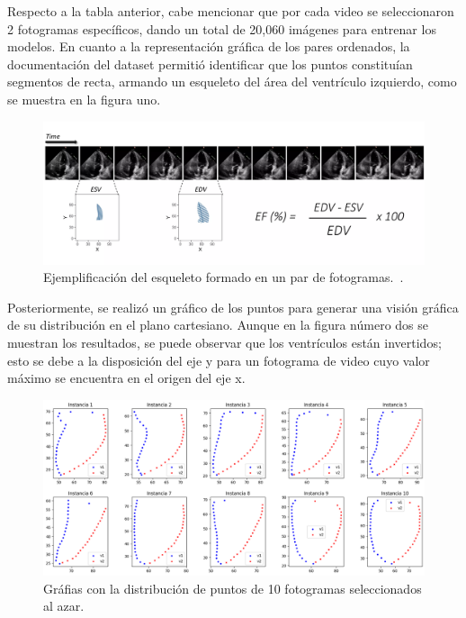 \documentclass[runningheads]{llncs}
\begin{document}
Respecto a la tabla anterior, cabe mencionar que por cada video se seleccionaron 2 fotogramas específicos, dando un total de 20,060 imágenes para entrenar los modelos. En cuanto a la representación gráfica de los pares ordenados, la documentación del dataset permitió identificar que los puntos constituían segmentos de recta, armando un esqueleto del área del ventrículo izquierdo, como se muestra en la figura uno.

\begin{figure}
    \centering
    \includegraphics[scale=0.085]{images/esqueleto2.png}
    \caption{Ejemplificación del esqueleto formado en un par de fotogramas.~\cite{ref_url1}.}\label{fig:imagen1}
\end{figure}

Posteriormente, se realizó un gráfico de los puntos para generar una visión gráfica de su distribución en el plano cartesiano. Aunque en la figura número dos se muestran los resultados, se puede observar que los ventrículos están invertidos; esto se debe a la disposición del eje y para un fotograma de video cuyo valor máximo se encuentra en el origen del eje x.

\begin{figure}
    \centering
    \includegraphics[scale=0.32]{images/Graficas.png}
    \caption{Gráfias con la distribución de puntos de 10 fotogramas seleccionados al azar.}\label{fig:imagen1}
\end{figure}
\end{document}
